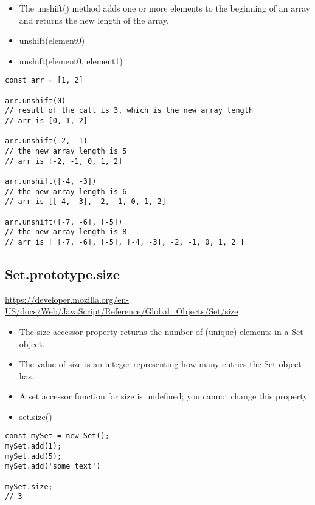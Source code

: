 \documentclass[10pt]{article}
\begin{document}
\begin{itemize}
	\item The unshift() method adds one or more elements to the beginning of an array and returns the new length of the array.
	\item unshift(element0)
	\item unshift(element0, element1)
\end{itemize}

\begin{lstlisting}[title=Examples using unshift(), captionpos=t]
const arr = [1, 2]

arr.unshift(0)               
// result of the call is 3, which is the new array length
// arr is [0, 1, 2]

arr.unshift(-2, -1)          
// the new array length is 5
// arr is [-2, -1, 0, 1, 2]

arr.unshift([-4, -3])        
// the new array length is 6
// arr is [[-4, -3], -2, -1, 0, 1, 2]

arr.unshift([-7, -6], [-5])  
// the new array length is 8
// arr is [ [-7, -6], [-5], [-4, -3], -2, -1, 0, 1, 2 ]
\end{lstlisting}



\medskip %











\medskip %
\pagebreak
\subsection{Set.prototype.size}

\url{https://developer.mozilla.org/en-US/docs/Web/JavaScript/Reference/Global_Objects/Set/size}

\begin{itemize}
	\item The size accessor property returns the number of (unique) elements in a Set object.
	\item The value of size is an integer representing how many entries the Set object has.
	\item A set accessor function for size is undefined; you cannot change this property.
	\item set.size()
\end{itemize}

\begin{lstlisting}[title=Examples using size(), captionpos=t]
const mySet = new Set();
mySet.add(1);
mySet.add(5);
mySet.add('some text')

mySet.size; 
// 3
\end{lstlisting}
\end{document}
